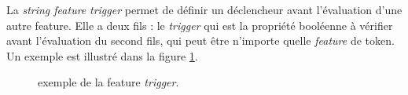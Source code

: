 \documentclass[manual-fr.tex]{subfiles}
\begin{document}
La \textit{string feature} \textit{trigger} permet de définir un déclencheur avant l'évaluation d'une autre feature. Elle a deux fils : le \textit{trigger} qui est la propriété booléenne à vérifier avant l'évaluation du second fils, qui peut être n'importe quelle \textit{feature} de token. Un exemple est illustré dans la figure \ref{fig:feature-triggered}.

\begin{figure}[ht!]
\footnotesize
\begin{xml}
\end{xml}
\caption{exemple de la feature \textit{trigger}.}
\label{fig:feature-triggered}
\end{figure}
\end{document}

